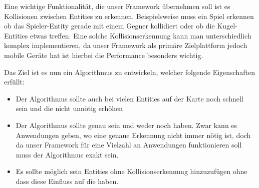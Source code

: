 








Eine wichtige Funktionalität, die unser Framework übernehmen soll ist es Kollisionen zwischen Entities zu erkennen. Beispielsweise muss ein Spiel erkennen ob das Spieler-Entity gerade mit einem Gegner kollidiert oder ob die Kugel-Entities etwas treffen. Eine solche Kollisionserkennung kann man unterschiedlich komplex implementieren, da unser Framework als primäre Zielplattform jedoch mobile Geräte hat ist hierbei die Performance besonders wichtig.

Das Ziel ist es nun ein Algorithmus zu entwickeln, welcher folgende Eigenschaften erfüllt:\cite[S 73]{KRAY}

\begin{itemize}
\item Der Algorithmus sollte auch bei vielen Entities auf der Karte noch schnell sein und die  nicht unnötig erhöhen \cite[S 14f]{KRAY}
\item Der Algorithmus sollte genau sein und weder  noch  haben. Zwar kann es Anwendungen geben, wo eine genaue Erkennung nicht immer nötig ist, doch da unser Framework für eine Vielzahl an Anwendungen funktionieren soll muss der Algorithmus exakt sein.
\item Es sollte möglich sein Entities ohne Kollisionserkennung hinzuzufügen ohne dass diese Einfluss auf die  haben.
\end{itemize}

